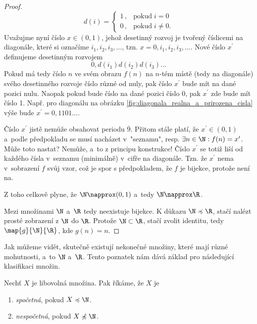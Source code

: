 \begin{proof}
    \begin{equation*}
        d(i)=\left\{
        \begin{array}{ll}
            1\,, & \text{pokud}\;i=0\\
            0\,, & \text{pokud}\;i\neq 0.
        \end{array}
        \right.
    \end{equation*}
    Uvažujme nyní číslo $x\in(0,1)$, jehož desetinný rozvoj je tvořený číslicemi na diagonále, které si označíme $i_1,i_2,i_3,\dots$, tzn. $x=0,i_1,i_2,i_3,\dots$. Nové číslo $x^\prime$ definujeme desetinným rozvojem
    \begin{equation*}
        0,d(i_1)d(i_2)d(i_3)\dots
    \end{equation*}
    Pokud má tedy číslo $n$ ve svém obrazu $f(n)$ na $n$-tém místě (tedy na diagonále) svého desetinného rozvoje číslo různé od nuly, pak číslo $x^\prime$ bude mít na dané pozici nulu. Naopak pokud bude číslo na dané pozici číslo 0, pak $x^\prime$ zde bude mít číslo 1. Např. pro diagonálu na obrázku \ref{fig:diagonala_realna_a_prirozena_cisla} výše bude $x^\prime=0,1101\dots$.\par
    Číslo $x^\prime$ jistě nemůže obsahovat periodu $\overline{9}$. Přitom stále platí, že $x^\prime\in(0,1)$ a~podle předpokladu se musí nacházet v~"seznamu", resp. $\exists n\in\N: f(n)=x^\prime$. Může toto nastat? Nemůže, a~to z principu konstrukce! Číslo $x^\prime$ se totiž liší od každého čísla v~seznamu (minimálně) v~cifře na diagonále. Tzn. že $x^\prime$ nema v~sobrazení $f$ svůj vzor, což je spor s předpokladem, že $f$ je bijekce, protože není na.\par
    Z toho celkově plyne, že $\N\napprox(0,1)$ a~tedy $\N\napprox\R$.
    \medskip

    Mezi množinami $\N$ a~$\R$ tedy neexistuje bijekce. K důkazu $\N\preccurlyeq\R$, stačí nalézt prosté zobrazení z $\N$ do $\R$. Protože $\N\subset\R$, stačí zvolit identitu, tedy $\map{g}{\N}{\R}$, kde $g(n)=n$.
\end{proof}
\needspace{1cm}
Jak můžeme vidět, skutečně existují nekonečné množiny, které mají různé mohutnosti, a~to $\N$ a~$\R$.  Tento poznatek nám dává základ pro následující klasifikaci množin.
\begin{definition}\label{def:spocetna_a_nespocetna_mnozina}
    Nechť $X$ je libovolná množina. Pak říkáme, že $X$ je
    \begin{enumerate}[label=(\roman*)]
        \item \emph{spočetná}, pokud $X\preccurlyeq\N$.
        \item \emph{nespočetná}, pokud $X\not\preccurlyeq\N$.
    \end{enumerate}
\end{definition}
